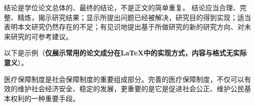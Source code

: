 
\begin{conclusion}

结论是学位论文总体的、最终的结论，不是正文的简单重复。
结论应当合理、完整、精炼，揭示研究结果；显示所提出问题已经被解决，研究目的得到实现；适当表明本文研究仍然存在的不足；有见识地提出基于所做研究的新的研究方向、对未来研究的可参考建议。

以下是示例（{\bf 仅展示常用的论文成分在LaTeX中的实现方式，内容与格式无实际意义}）。

医疗保障制度是社会保障制度的重要组成部分。完善的医疗保障制度，不仅可以有效的维护社会经济安全、稳定的发展，更重要的是它是促进社会公正、维护公民基本权利的一种重要手段。

\end{conclusion}


